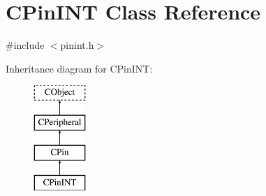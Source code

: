 \hypertarget{class_c_pin_i_n_t}{\section{C\-Pin\-I\-N\-T Class Reference}
\label{class_c_pin_i_n_t}
}


{\ttfamily \#include $<$pinint.\-h$>$}

Inheritance diagram for C\-Pin\-I\-N\-T\-:\begin{figure}[H]
\begin{center}
\leavevmode
\includegraphics[height=4.000000cm]{db/d2c/class_c_pin_i_n_t}
\end{center}
\end{figure}
